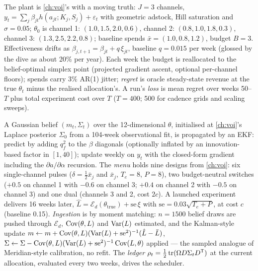 The plant is \cref{ch:voi}'s with a moving truth: $J = 3$ channels, $y_t = \sum_j\beta_{jt}h(a_{jt};K_j,S_j) + \varepsilon_t$ with geometric adstock, Hill saturation and $\sigma = 0.05$; $\theta_0$ is channel 1: $(1.0, 1.5, 2.0, 0.6)$, channel 2: $(0.8, 1.0, 1.8, 0.3)$, channel 3: $(1.3, 2.5, 2.2, 0.8)$; baseline spends $\bar x = (1.0, 0.8, 1.2)$, budget $B = 3$. Effectiveness drifts as $\beta_{j,t+1} = \beta_{jt} + q\,\xi_{jt}$, baseline $q = 0.015$ per week (glossed by the dive as about 20\% per year). Each week the budget is reallocated to the belief-optimal simplex point (projected gradient ascent, optional per-channel floors); spends carry 3\% AR(1) jitter; \emph{regret} is oracle steady-state revenue at the true $\theta_t$ minus the realised allocation's. A run's \emph{loss} is mean regret over weeks 50--$T$ plus total experiment cost over $T$ ($T = 400$; 500 for cadence grids and scaling sweeps).

\begin{construction}
\label{fusion:con:loop}
A Gaussian belief $(m_t,\Sigma_t)$ over the 12-dimensional $\theta$, initialised at \cref{ch:voi}'s Laplace posterior $\Sigma_0$ from a 104-week observational fit, is propagated by an EKF: predict by adding $q_f^2$ to the $\beta$ diagonals (optionally inflated by an innovation-based factor in $[1,40]$); update weekly on $y_t$ with the closed-form gradient including the $\partial a/\partial\alpha$ recursion. The \emph{menu} holds nine designs from \cref{ch:voi}: six single-channel pulses ($\delta = \tfrac12\bar x_j$ and $\bar x_j$, $T_e = 8$, $P = 8$), two budget-neutral switches ($+0.5$ on channel 1 with $-0.6$ on channel 3; $+0.4$ on channel 2 with $-0.5$ on channel 3) and one dual (channels 3 and 2, cost $2c$). A launched experiment delivers 16 weeks later, $\hat L = \mathcal E_d(\theta_{\mathrm{true}}) + \mathrm{se}\,\xi$ with $\mathrm{se} = 0.03\sqrt{T_e + P}$, at cost $c$ (baseline 0.15). \emph{Ingestion} is by moment matching: $n = 1500$ belief draws are pushed through $\mathcal E_d$, $\operatorname{Cov}(\theta,L)$ and $\operatorname{Var}(L)$ estimated, and the Kalman-style update $m \leftarrow m + \operatorname{Cov}(\theta,L)(\operatorname{Var}(L) + \mathrm{se}^2)^{-1}(\hat L - \bar L)$, $\Sigma \leftarrow \Sigma - \operatorname{Cov}(\theta,L)(\operatorname{Var}(L) + \mathrm{se}^2)^{-1}\operatorname{Cov}(L,\theta)$ applied --- the sampled analogue of Meridian-style calibration, no refit. The \emph{ledger} $\rho_t = \tfrac12\operatorname{tr}(\Omega D\Sigma_tD^{\mathsf{T}})$ at the current allocation, evaluated every two weeks, drives the scheduler.
\end{construction}

